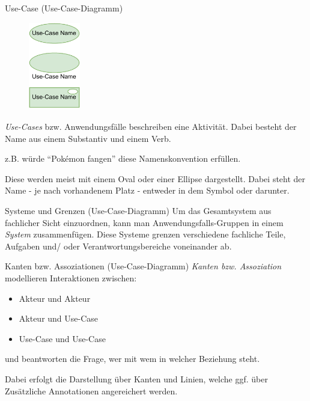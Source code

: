 \begin{defi}{Use-Case (Use-Case-Diagramm)}
    \begin{figure}
        \centering
        \includegraphics[width=0.2\textwidth]{includes/figures/defi_diagrams_use_case.pdf}
    \end{figure}
    \emph{Use-Cases} bzw. Anwendungsfälle beschreiben eine Aktivität.
    Dabei besteht der Name aus einem Substantiv und einem Verb.

    z.B. würde \enquote{Pokémon fangen} diese Namenskonvention erfüllen.

    Diese werden meist mit einem Oval oder einer Ellipse dargestellt.
    Dabei steht der Name - je nach vorhandenem Platz - entweder in dem Symbol oder darunter.

    \vspace{2.5cm}
\end{defi}

\begin{defi}{Systeme und Grenzen (Use-Case-Diagramm)}
    Um das Gesamtsystem aus fachlicher Sicht einzuordnen, kann man Anwendungsfalls-Gruppen in einem \emph{System} zusammenfügen.
    Diese Systeme grenzen verschiedene fachliche Teile, Aufgaben und/ oder Verantwortungsbereiche voneinander ab.

\end{defi}

\begin{defi}{Kanten bzw. Assoziationen (Use-Case-Diagramm)}
    \emph{Kanten bzw. Assoziation} modellieren Interaktionen zwischen:
    \begin{itemize}
        \item Akteur und Akteur
        \item Akteur und Use-Case
        \item Use-Case und Use-Case
    \end{itemize}
    und beantworten die Frage, wer mit wem in welcher Beziehung steht.

    Dabei erfolgt die Darstellung über Kanten und Linien, welche ggf. über Zusätzliche Annotationen angereichert werden.
\end{defi}

